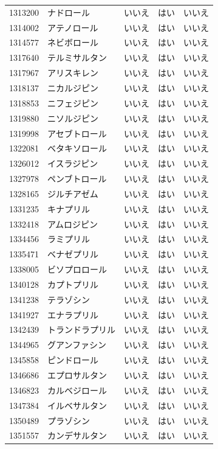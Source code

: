\documentclass[
  11pt]{book}
\theoremstyle{definition}
\theoremstyle{definition}
\theoremstyle{definition}
\theoremstyle{definition}
\theoremstyle{remark}
\begin{document}
\begin{longtable}[]{@{}lllll@{}}
1313200 & ナドロール & いいえ & はい & いいえ \\
1314002 & アテノロール & いいえ & はい & いいえ \\
1314577 & ネビボロール & いいえ & はい & いいえ \\
1317640 & テルミサルタン & いいえ & はい & いいえ \\
1317967 & アリスキレン & いいえ & はい & いいえ \\
1318137 & ニカルジピン & いいえ & はい & いいえ \\
1318853 & ニフェジピン & いいえ & はい & いいえ \\
1319880 & ニソルジピン & いいえ & はい & いいえ \\
1319998 & アセブトロール & いいえ & はい & いいえ \\
1322081 & ベタキソロール & いいえ & はい & いいえ \\
1326012 & イスラジピン & いいえ & はい & いいえ \\
1327978 & ペンブトロール & いいえ & はい & いいえ \\
1328165 & ジルチアゼム & いいえ & はい & いいえ \\
1331235 & キナプリル & いいえ & はい & いいえ \\
1332418 & アムロジピン & いいえ & はい & いいえ \\
1334456 & ラミプリル & いいえ & はい & いいえ \\
1335471 & ベナゼプリル & いいえ & はい & いいえ \\
1338005 & ビソプロロール & いいえ & はい & いいえ \\
1340128 & カプトプリル & いいえ & はい & いいえ \\
1341238 & テラゾシン & いいえ & はい & いいえ \\
1341927 & エナラプリル & いいえ & はい & いいえ \\
1342439 & トランドラプリル & いいえ & はい & いいえ \\
1344965 & グアンファシン & いいえ & はい & いいえ \\
1345858 & ピンドロール & いいえ & はい & いいえ \\
1346686 & エプロサルタン & いいえ & はい & いいえ \\
1346823 & カルベジロール & いいえ & はい & いいえ \\
1347384 & イルベサルタン & いいえ & はい & いいえ \\
1350489 & プラゾシン & いいえ & はい & いいえ \\
1351557 & カンデサルタン & いいえ & はい & いいえ \\

\end{longtable}
\end{document}
